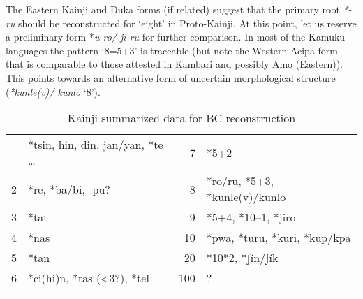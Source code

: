 The Eastern Kainji and Duka forms (if related) suggest that the primary root \textit{*-ru} should be reconstructed for ‘eight’ in Proto-Kainji. At this point, let us reserve a preliminary form *\textit{u-ro/ ji-ru} for further comparison. In most of the Kamuku languages the pattern ‘8=5+3’ is traceable (but note the Western Acipa form that is comparable to those attested in Kambari and possibly Amo (Eastern)). This points towards an alternative form of uncertain morphological structure (\textit{*kunle(v)/ kunlo} ‘8’).
  
\newpage   
{}\label{sec:3.1.2.7.6}

\begin{table}[b]
\caption{\label{tab:3:41}Kainji {summarized data for BC reconstruction}}
\begin{tabularx}{\textwidth}{rXrl}
\lsptoprule
1 & *tsin, hin, din, jan/yan, *te … & 7 & *5+2\\
2 & *re, *ba/bi, -pu? & 8 & *ro/ru, *5+3, *kunle(v)/kunlo\\
3 & *tat & 9 & *5+4, *10--1, *jiro\\
4 & *nas & 10 & *pwa, *turu, *kuri, *kup/kpa\\
5 & *tan & 20 & *10*2, *ʃín/ʃík\\
6 & *ci(hi)n, *tas (<3?), *tel & 100 & ?\\
\lspbottomrule
\end{tabularx}
\end{table}


